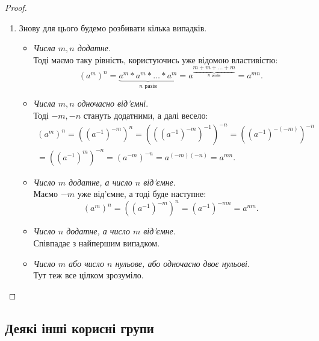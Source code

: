 \documentclass{math_library}
\begin{document}
\begin{proof}
\begin{enumerate}[nosep, wide=0pt, label={\arabic*)}]
\item Знову для цього будемо розбивати кілька випадків.
\begin{itemize}
\item \textit{Числа $m,n$ додатне}.\\
Тоді маємо таку рівність, користуючись уже відомою властивістю:
\[
(a^m)^n = \underbrace{a^m*a^m*\dots*a^m}_{n \text{ разів}} = a^{\scriptstyle\underbrace{\scriptstyle m+m+\dots+m}_{n \text{ разів}}} = a^{mn}.
\]
\item \textit{Числа $m,n$ одночасно від'ємні}.\\
Тоді $-m,-n$ стануть додатними, а далі весело:
\begin{align*}
(a^m)^{n} = ((a^{-1})^{-m})^{n} = (((a^{-1})^{-m})^{-1})^{-n} = ( (a^{-1})^{-(-m)} )^{-n} \\
= ((a^{-1})^m)^{-n} = (a^{-m})^{-n} = a^{(-m)(-n)} = a^{mn}.
\end{align*}
\item \textit{Число $m$ додатне, а число $n$ від'ємне}.\\
Маємо $-m$ уже від'ємне, а тоді буде наступне:
\[
(a^m)^{n} = ((a^{-1})^{-m})^n = (a^{-1})^{-mn} = a^{mn}.
\]
\item \textit{Число $n$ додатне, а число $m$ від'ємне}.\\
Співпадає з найпершим випадком.

\item \textit{Число $m$ або число $n$ нульове, або одночасно двоє нульові}.\\
Тут теж все цілком зрозуміло. \qedhere
\end{itemize}
\end{enumerate}
\end{proof}

\subsection{Деякі інші корисні групи}
\end{document}
